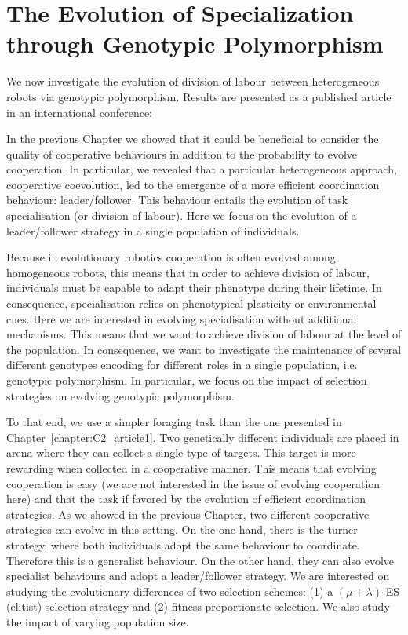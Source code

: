 \chapter{The Evolution of Specialization through Genotypic Polymorphism}
\label{chapter:C2_article2}

\setcounter{secnumdepth}{0}
\setcounter{minitocdepth}{1}
\minitoc[n] %

We now investigate the evolution of division of labour between heterogeneous robots via genotypic polymorphism. Results are presented as a published article in an international conference:

\begin{quote}
\end{quote}


In the previous Chapter we showed that it could be beneficial to consider the quality of cooperative behaviours in addition to the probability to evolve cooperation. In particular, we revealed that a particular heterogeneous approach, cooperative coevolution, led to the emergence of a more efficient coordination behaviour: leader/follower. This behaviour entails the evolution of task specialisation (or division of labour). Here we focus on the evolution of a leader/follower strategy in a single population of individuals. 

Because in evolutionary robotics cooperation is often evolved among homogeneous robots, this means that in order to achieve division of labour, individuals must be capable to adapt their phenotype during their lifetime. In consequence, specialisation relies on phenotypical plasticity or environmental cues. Here we are interested in evolving specialisation without additional mechanisms. This means that we want to achieve division of labour at the level of the population. In consequence, we want to investigate the maintenance of several different genotypes encoding for different roles in a single population, i.e. genotypic polymorphism. In particular, we focus on the impact of selection strategies on evolving genotypic polymorphism.

To that end, we use a simpler foraging task than the one presented in Chapter~\ref{chapter:C2_article1}. Two genetically different individuals are placed in arena where they can collect a single type of targets. This target is more rewarding when collected in a cooperative manner. This means that evolving cooperation is easy (we are not interested in the issue of evolving cooperation here) and that the task if favored by the evolution of efficient coordination strategies. As we showed in the previous Chapter, two different cooperative strategies can evolve in this setting. On the one hand, there is the turner strategy, where both individuals adopt the same behaviour to coordinate. Therefore this is a generalist behaviour. On the other hand, they can also evolve specialist behaviours and adopt a leader/follower strategy. We are interested on studying the evolutionary differences of two selection schemes: (1) a \((\mu + \lambda)\)-ES (elitist) selection strategy and (2) fitness-proportionate selection. We also study the impact of varying population size.

